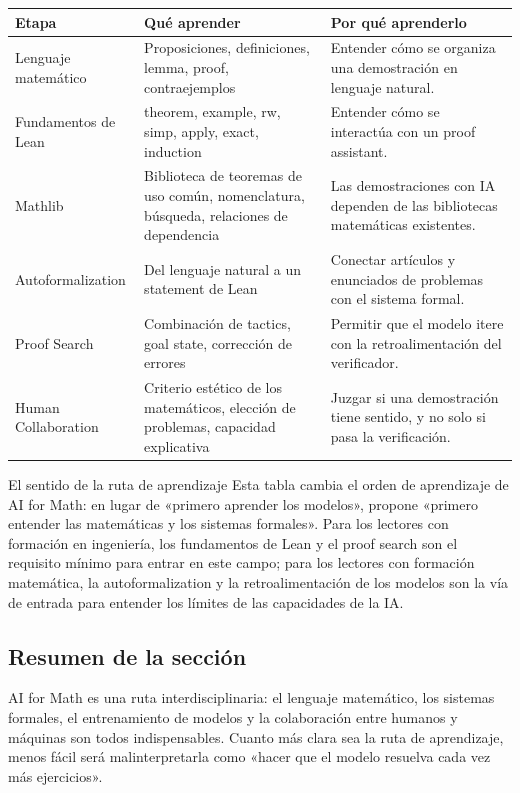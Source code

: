 \documentclass[a4paper]{article}
\begin{document}
\noindent\begin{longtable}{p{}p{}p{}}
\toprule
Etapa & Qué aprender & Por qué aprenderlo \\
\midrule
Lenguaje matemático & Proposiciones, definiciones, lemma, proof, contraejemplos & Entender cómo se organiza una demostración en lenguaje natural. \\
Fundamentos de Lean & theorem, example, rw, simp, apply, exact, induction & Entender cómo se interactúa con un proof assistant. \\
Mathlib & Biblioteca de teoremas de uso común, nomenclatura, búsqueda, relaciones de dependencia & Las demostraciones con IA dependen de las bibliotecas matemáticas existentes. \\
Autoformalization & Del lenguaje natural a un statement de Lean & Conectar artículos y enunciados de problemas con el sistema formal. \\
Proof Search & Combinación de tactics, goal state, corrección de errores & Permitir que el modelo itere con la retroalimentación del verificador. \\
Human Collaboration & Criterio estético de los matemáticos, elección de problemas, capacidad explicativa & Juzgar si una demostración tiene sentido, y no solo si pasa la verificación. \\
\bottomrule
\end{longtable}

\begin{knowledgebox}{El sentido de la ruta de aprendizaje}
Esta tabla cambia el orden de aprendizaje de AI for Math: en lugar de «primero aprender los modelos», propone «primero entender las matemáticas y los sistemas formales». Para los lectores con formación en ingeniería, los fundamentos de Lean y el proof search son el requisito mínimo para entrar en este campo; para los lectores con formación matemática, la autoformalization y la retroalimentación de los modelos son la vía de entrada para entender los límites de las capacidades de la IA.
\end{knowledgebox}

\subsection{Resumen de la sección}

AI for Math es una ruta interdisciplinaria: el lenguaje matemático, los sistemas formales, el entrenamiento de modelos y la colaboración entre humanos y máquinas son todos indispensables. Cuanto más clara sea la ruta de aprendizaje, menos fácil será malinterpretarla como «hacer que el modelo resuelva cada vez más ejercicios».
\end{document}
